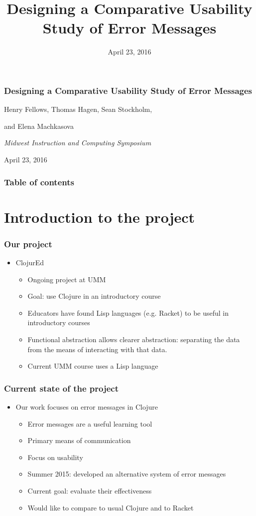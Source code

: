 \documentclass{beamer}
\begin{document}
\title{Designing a Comparative Usability Study of Error Messages}
\date{April 23, 2016}

\begin{frame}
\frametitle{Designing a Comparative Usability Study of Error Messages}
{\centering
\noindent
Henry Fellows, Thomas Hagen, Sean Stockholm, \par
and Elena Machkasova \par

{\it 
Midwest Instruction and Computing Symposium\par
April 23, 2016\par}
}
\end{frame}

\begin{frame}
\frametitle{Table of contents}
\tableofcontents  
\end{frame}

\section{Introduction to the project}

\begin{frame}
\frametitle{Our project}
	\begin{itemize}
		\item ClojurEd
			\begin{itemize}
				\item Ongoing project at UMM
				\item Goal: use Clojure in an introductory course
				\item Educators have found Lisp languages (e.g. Racket) to be useful in introductory courses
				\item Functional abstraction allows clearer abstraction: separating the data from the means of interacting with that data. 
				\item Current UMM course uses a Lisp language 
			\end{itemize}
	\end{itemize}
\end{frame}


\begin{frame}
\frametitle{Current state of the project}
	\begin{itemize}
		\item Our work focuses on error messages in Clojure
			\begin{itemize}
				\item Error messages are a useful learning tool
				\item Primary means of communication
				\item Focus on usability
				\item Summer 2015: developed an alternative system of error messages
				\item Current goal: evaluate their effectiveness
				\item Would like to compare to usual Clojure and to Racket
			\end{itemize}
	\end{itemize}
\end{frame}
\end{document}
